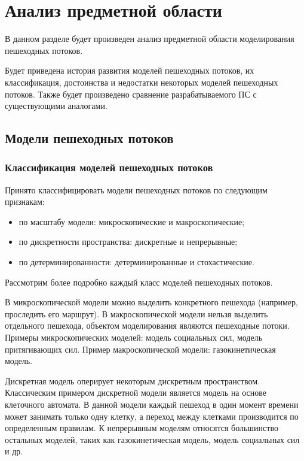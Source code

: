 \section{Анализ предметной области}
\label{sec:domain}

В данном разделе будет произведен анализ предметной области моделирования пешеходных потоков.

Будет приведена история развития моделей пешеходных потоков, их классификация, достоинства и недостатки некоторых моделей пешеходных потоков.
Также будет произведено сравнение разрабатываемого ПС с существующими аналогами.

\subsection{Модели пешеходных потоков}
\label{sub:domain:models}

\subsubsection{Классификация моделей пешеходных потоков}
\label{sub:domain:models:classification}

Принято классифицировать модели пешеходных потоков по следующим признакам:

\begin{itemize}
  \item по масштабу модели: микроскопические и макроскопические;
  \item по дискретности пространства: дискретные и непрерывные;
  \item по детерминированности: детерминированные и стохастические.
\end{itemize}

Рассмотрим более подробно каждый класс моделей пешеходных потоков.

В микроскопической модели можно выделить конкретного пешехода (например, проследить его маршрут).
В макроскопической модели нельзя выделить отдельного пешехода, объектом моделирования являются пешеходные потоки.
Примеры микроскопических моделей: модель социальных сил, модель притягивающих сил.
Пример макроскопической модели: газокинетическая модель.

Дискретная модель оперирует некоторым дискретным пространством.
Классическим примером дискретной модели является модель на основе клеточного автомата.
В данной модели каждый пешеход в один момент времени может занимать только одну клетку, а переход между клетками производится по определенным правилам.
К непрерывным моделям относятся большинство остальных моделей, таких как газокинетическая модель, модель социальных сил и др.

